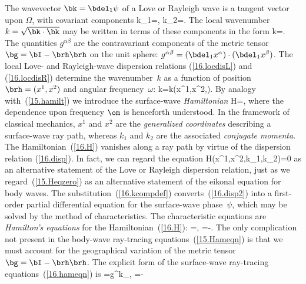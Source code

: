 The wavevector $\bk=\bdel_1\psi$ of a Love or Rayleigh wave
is a tangent vector upon $\Omega$, with covariant components
\eq \label{16.kcompdef}
k_1=,\qquad
k_2=.
\en
The local wavenumber~$k=\sqrt{\bk\cdot\bk}$ may be written
in terms of these components in the form
\eq
k=.
\en
The quantities $g^{\alpha\beta}$ are the contravariant components
of the metric tensor $\bg=\bI-\brh\brh$ on the unit sphere:
$g^{\alpha\beta}=(\bdel_1x^\alpha)\cdot(\bdel_1x^\beta)$.
The local Love- and Rayleigh-wave dispersion relations
(\ref{16.locdisL}) and (\ref{16.locdisR}) determine
the wavenumber~$k$ as a function of position $\brh=(x^1,x^2)$
and angular frequency~$\omega$:
\eq \label{16.disp}
k=k(x^1,x^2,\omega).
\en
By analogy with~(\ref{15.hamilt}) we introduce the
surface-wave {\em Hamiltonian\/}
%
%
\eq \label{16.H}
H=,
\en
where the dependence upon frequency $\om$ is henceforth understood.
In the framework of classical mechanics, $x^1$ and $x^2$ are
the {\em generalized coordinates\/} describing a surface-wave ray path,
%
whereas $k_1$ and $k_2$ are the associated {\em conjugate momenta\/}.
%
%
The Hamiltonian~(\ref{16.H}) vanishes along a ray path by virtue of the
dispersion relation (\ref{16.disp}).  In fact, we can regard the
equation
\eq \label{16.disp2}
H(x^1,x^2,k_1,k_2)=0
\en
as an alternative statement of the Love or Rayleigh dispersion relation,
just as we regard~(\ref{15.Heqzero}) as an alternative statement
of the eikonal equation for body waves.  The
substitution~(\ref{16.kcompdef}) converts~(\ref{16.disp2})
into a first-order partial differential
equation for the surface-wave phase~$\psi$,
which may be solved by the method of characteristics.
The characteristic equations are
{\em Hamilton's equations\/} for
the Hamiltonian~(\ref{16.H}):
%
\eq \label{16.hameqn}
=,\qquad
{}=-.
\en
The only complication not present in the body-wave
ray-tracing equations~(\ref{15.Hameqn}) is that we
must account for the geographical variation of the
metric tensor $\bg=\bI-\brh\brh$. The explicit form
of the surface-wave ray-tracing
equations~(\ref{16.hameqn}) is
\eq \label{16.rayeqns}
=g^{\gamma\eta}k_\eta,\qquad
{}=-\half\hspace{0.3 mm}
